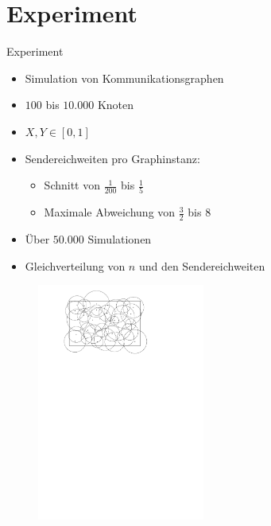 \documentclass[18pt]{beamer}
\begin{document}
\section{Experiment}
\begin{frame}{Experiment}
	\begin{itemize}
		\item Simulation von Kommunikationsgraphen
		\item $100$ bis $10.000$ Knoten
		\item $X,Y \in [0,1]$
		\item Sendereichweiten pro Graphinstanz:
		\begin{itemize}
			\item Schnitt von $\frac{1}{200}$ bis $\frac{1}{5}$
			\item Maximale Abweichung von $\frac{3}{2}$ bis $8$
		\end{itemize}
		\item Über $50.000$ Simulationen
		\item Gleichverteilung von $n$ und den Sendereichweiten
		\end{itemize}
	\begin{figure}
	
	\includegraphics[width=5.5cm,clip=true,trim=19pt 29pt 24pt 38pt]{pdf/experiment.pdf}
	\end{figure}
	\end{frame}
	
\end{document}
